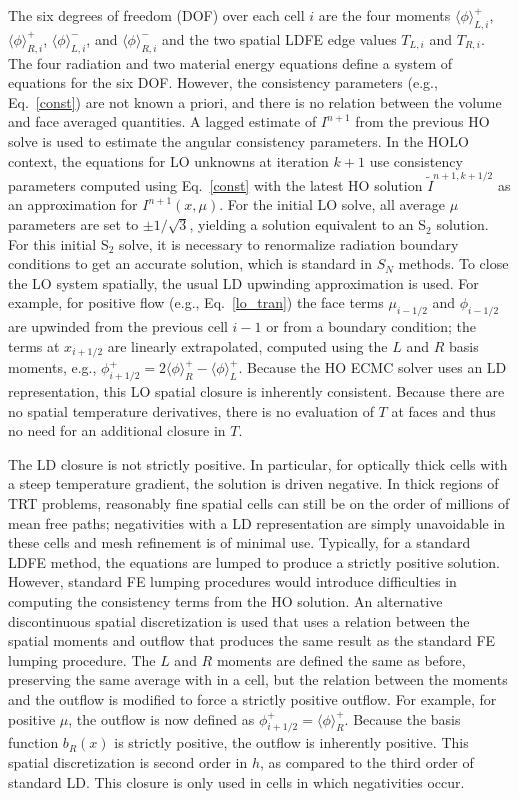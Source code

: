 \documentclass{mc2013}
\newcommand{\mom}[1]{\langle #1 \rangle}
\begin{document}
\label{sec:closure}

The six degrees of freedom (DOF) over each cell $i$ are the four moments $\mom{\phi}_{L,i}^+$,
$\mom{\phi}_{R,i}^+$, $\mom{\phi}_{L,i}^-$, and $\mom{\phi}_{R,i}^-$ and the two
spatial LDFE edge values $T_{L,i}$ and $T_{R,i}$. The four radiation and two material
energy equations define a system of equations for the six DOF.
However, the consistency parameters (e.g., Eq.~\eqref{const}) are not known a priori, and
there is no relation between the volume and face averaged quantities. 
A lagged estimate of $I^{n+1}$ from the previous HO solve is
used to estimate the angular consistency parameters. In the HOLO
context, the equations for LO unknowns at iteration $k+1$ use consistency parameters
computed using Eq.~\eqref{const} with the latest HO solution $\tilde{I}^{n+1,k+1/2}$
as an approximation for $I^{n+1}(x,\mu)$. For the initial LO
solve, all average $\mu$ parameters are
set to $\pm 1/\sqrt{3}$, yielding a solution equivalent to an S$_2$ solution.  For this initial S$_2$ solve, it is necessary
to renormalize radiation boundary conditions to get an accurate solution, which is standard in $S_N$ methods.
To close the LO system spatially, the usual LD upwinding
approximation is used.  For example, for positive flow (e.g., Eq.~\eqref{lo_tran}) the face terms $\mu_{i-1/2}$ and $\phi_{i-1/2}$
are upwinded from the previous cell $i-1$ or from a boundary condition; the terms
at $x_{i+1/2}$ are linearly extrapolated, computed using the $L$ and $R$ basis
moments, e.g., $\phi^+_{i+1/2} = 2\mom{\phi}_R^+ - \mom{\phi}_L^+$. 
Because the HO ECMC solver uses an LD representation, this LO spatial closure is inherently
consistent.  Because there are no
spatial temperature derivatives, there is no evaluation of $T$ at faces and thus no need for an
additional closure in $T$.  

The LD closure is not strictly positive.  In particular, for
optically thick cells with a steep temperature gradient, the solution is driven negative.  In thick regions of
TRT problems, reasonably fine spatial cells can still be on the order of millions of mean
free paths; negativities with a LD representation are simply unavoidable in these cells and mesh
refinement is of minimal use.  Typically, for a standard LDFE method,
the equations are lumped to produce a strictly positive solution. However, standard FE lumping
procedures would introduce difficulties in computing the consistency terms from the
HO solution.  
An alternative discontinuous spatial discretization is used that uses a relation between the
spatial moments and outflow that produces the same result as the
standard FE lumping procedure.  The $L$ and $R$ moments are defined the same as before,
preserving the same average with in a cell, but the relation between the moments and
the outflow is modified to force a strictly positive outflow.   For example, for positive $\mu$,
the outflow is now defined as $\phi^+_{i+1/2} = \mom{\phi}_R^+.$  Because the basis function $b_R(x)$ is strictly
positive, the outflow is inherently positive.  This spatial
discretization is second order in $h$, as compared to the third order of standard LD.  This closure is only used
in cells in which negativities occur.
\end{document}
